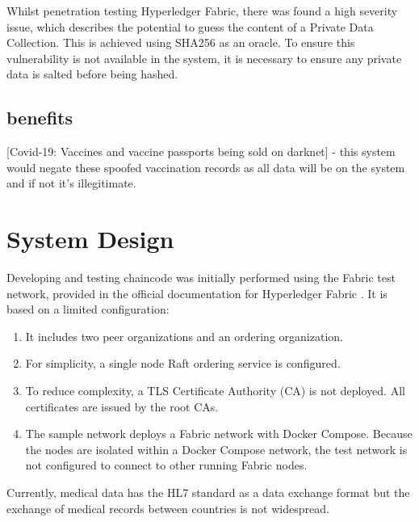 \documentclass{report}
\begin{document}
\begin{flushleft}
Whilst penetration testing Hyperledger Fabric, there was found a high severity issue, which describes the potential to guess the content of a Private Data Collection.
This is achieved using SHA256 as an oracle. To ensure this vulnerability is not available in the system, it is necessary to ensure any private data is salted before being hashed. \cite{shaw_penetration_2019}

\section{benefits}
[Covid-19: Vaccines and vaccine passports being sold on darknet] - this system would negate these spoofed vaccination records as all data will be on the system and if not it's illegitimate.
\linebreak[3]

\chapter{System Design}

Developing and testing chaincode was initially performed using the Fabric test network, provided in the official documentation for Hyperledger Fabric \cite{noauthor_using_nodate}. 
It is based on a limited configuration:
\begin{enumerate}
\item{It includes two peer organizations and an ordering organization.}
\item{For simplicity, a single node Raft ordering service is configured.}
\item{To reduce complexity, a TLS Certificate Authority (CA) is not deployed. All certificates are issued by the root CAs.}
\item{The sample network deploys a Fabric network with Docker Compose. Because the nodes are isolated within a Docker Compose network, the test network is not configured to connect to other running Fabric nodes.} \cite{noauthor_using_nodate}
\end{enumerate}


Currently, medical data has the HL7 standard as a data exchange format but the
exchange of medical records between countries is not widespread. \cite{kung_personal_2020}


\end{flushleft}
\end{document}
